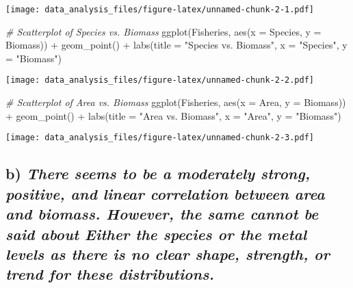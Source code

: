 \documentclass[
]{article}
\newenvironment{Shaded}{\begin{snugshade}}{\end{snugshade}}
\newcommand{\AttributeTok}[1]{\textcolor[rgb]{0.77,0.63,0.00}{#1}}
\newcommand{\CommentTok}[1]{\textcolor[rgb]{0.56,0.35,0.01}{\textit{#1}}}
\newcommand{\FunctionTok}[1]{\textcolor[rgb]{0.00,0.00,0.00}{#1}}
\newcommand{\NormalTok}[1]{#1}
\newcommand{\SpecialCharTok}[1]{\textcolor[rgb]{0.00,0.00,0.00}{#1}}
\newcommand{\StringTok}[1]{\textcolor[rgb]{0.31,0.60,0.02}{#1}}
\begin{document}
\texttt{[image: data\_analysis\_files/figure-latex/unnamed-chunk-2-1.pdf]}

\begin{Shaded}
\begin{Highlighting}[]
\CommentTok{\# Scatterplot of Species vs. Biomass}
\FunctionTok{ggplot}\NormalTok{(Fisheries, }\FunctionTok{aes}\NormalTok{(}\AttributeTok{x =}\NormalTok{ Species, }\AttributeTok{y =}\NormalTok{ Biomass)) }\SpecialCharTok{+}
  \FunctionTok{geom\_point}\NormalTok{() }\SpecialCharTok{+}
  \FunctionTok{labs}\NormalTok{(}\AttributeTok{title =} \StringTok{"Species vs. Biomass"}\NormalTok{, }\AttributeTok{x =} \StringTok{"Species"}\NormalTok{, }\AttributeTok{y =} \StringTok{"Biomass"}\NormalTok{)}
\end{Highlighting}
\end{Shaded}

\texttt{[image: data\_analysis\_files/figure-latex/unnamed-chunk-2-2.pdf]}

\begin{Shaded}
\begin{Highlighting}[]
\CommentTok{\# Scatterplot of Area vs. Biomass}
\FunctionTok{ggplot}\NormalTok{(Fisheries, }\FunctionTok{aes}\NormalTok{(}\AttributeTok{x =}\NormalTok{ Area, }\AttributeTok{y =}\NormalTok{ Biomass)) }\SpecialCharTok{+}
  \FunctionTok{geom\_point}\NormalTok{() }\SpecialCharTok{+}
  \FunctionTok{labs}\NormalTok{(}\AttributeTok{title =} \StringTok{"Area vs. Biomass"}\NormalTok{, }\AttributeTok{x =} \StringTok{"Area"}\NormalTok{, }\AttributeTok{y =} \StringTok{"Biomass"}\NormalTok{)}
\end{Highlighting}
\end{Shaded}

\texttt{[image: data\_analysis\_files/figure-latex/unnamed-chunk-2-3.pdf]}

\hypertarget{b-there-seems-to-be-a-moderately-strong-positive-and-linear-correlation-between-area-and-biomass.-however-the-same-cannot-be-said-about-either-the-species-or-the-metal-levels-as-there-is-no-clear-shape-strength-or-trend-for-these-distributions.}{%
\subsection{\texorpdfstring{b) \emph{There seems to be a moderately
strong, positive, and linear correlation between area and biomass.
However, the same cannot be said about Either the species or the metal
levels as there is no clear shape, strength, or trend for these
distributions.}}{b) There seems to be a moderately strong, positive, and linear correlation between area and biomass. However, the same cannot be said about Either the species or the metal levels as there is no clear shape, strength, or trend for these distributions.}}\label{b-there-seems-to-be-a-moderately-strong-positive-and-linear-correlation-between-area-and-biomass.-however-the-same-cannot-be-said-about-either-the-species-or-the-metal-levels-as-there-is-no-clear-shape-strength-or-trend-for-these-distributions.}}
\end{document}
